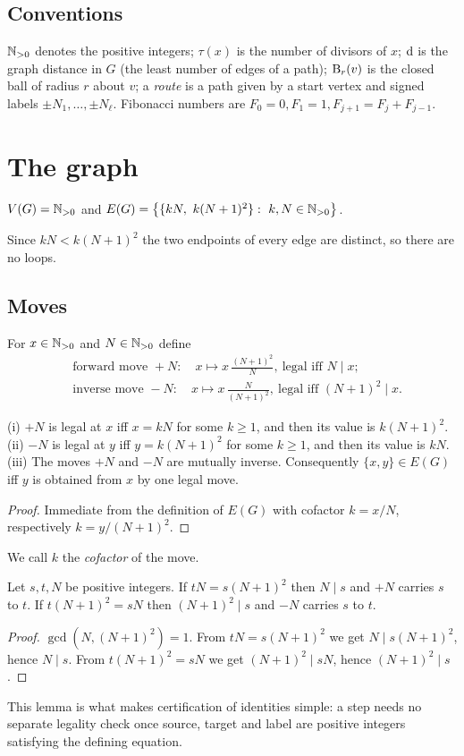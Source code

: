 \subsection{Conventions}
$\mathbb{N}_{>0}$ denotes the positive integers; $\tau(x)$ is the number of divisors of $x$; $\operatorname{d}$ is the graph distance in $G$ (the least number of edges of a path); $\operatorname{B}_r(v)$ is the closed ball of radius $r$ about $v$; a \emph{route} is a path given by a start vertex and signed labels $\pm N_1,\dots,\pm N_\ell$. Fibonacci numbers are $F_0=0,F_1=1,F_{j+1}=F_j+F_{j-1}$.

\section{The graph}\label{sec:graph}
\begin{definition}\label{def:G}
$V(G)=\mathbb{N}_{>0}$ and $E(G)=\bigl\{\{kN,\ k(N+1)^2\}:\ k,N\in\N_{>0}\bigr\}$.
\end{definition}
Since $kN<k(N+1)^2$ the two endpoints of every edge are distinct, so there are no loops.

\subsection{Moves}
For $x\in\mathbb{N}_{>0}$ and $N\in\mathbb{N}_{>0}$ define
\begin{align*}
&\text{forward move } +N:\quad x\mapsto x\,\frac{(N+1)^2}{N},\ \text{legal iff } N\mid x;\\
&\text{inverse move } -N:\quad x\mapsto x\,\frac{N}{(N+1)^2},\ \text{legal iff } (N+1)^2\mid x.
\end{align*}
\begin{lemma}\label{lem:moves}
(i) $+N$ is legal at $x$ iff $x=kN$ for some $k\ge1$, and then its value is $k(N+1)^2$. (ii) $-N$ is legal at $y$ iff $y=k(N+1)^2$ for some $k\ge1$, and then its value is $kN$. (iii) The moves $+N$ and $-N$ are mutually inverse. Consequently $\{x,y\}\in E(G)$ iff $y$ is obtained from $x$ by one legal move.
\end{lemma}
\begin{proof} Immediate from the definition of $E(G)$ with cofactor $k=x/N$, respectively $k=y/(N+1)^2$. \end{proof}
We call $k$ the \emph{cofactor} of the move.

\begin{lemma}\label{lem:legal}
Let $s,t,N$ be positive integers. If $tN=s(N+1)^2$ then $N\mid s$ and $+N$ carries $s$ to $t$. If $t(N+1)^2=sN$ then $(N+1)^2\mid s$ and $-N$ carries $s$ to $t$.
\end{lemma}
\begin{proof} $\gcd(N,(N+1)^2)=1$. From $tN=s(N+1)^2$ we get $N\mid s(N+1)^2$, hence $N\mid s$. From $t(N+1)^2=sN$ we get $(N+1)^2\mid sN$, hence $(N+1)^2\mid s$. \end{proof}
This lemma is what makes certification of identities simple: a step needs no separate legality check once source, target and label are positive integers satisfying the defining equation.

